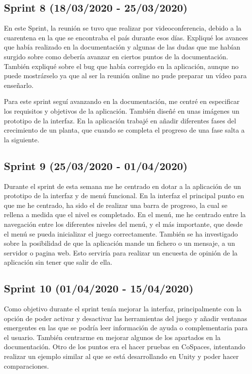 \subsection{Sprint 8 (18/03/2020 - 25/03/2020)}
En este Sprint, la reunión se tuvo que realizar por videoconferencia, debido a la cuarentena en la que se encontraba el país durante esos días. Expliqué los avances que había realizado en la documentación y algunas de las dudas que me habían surgido sobre como debería avanzar en ciertos puntos de la documentación. También expliqué sobre el bug que había corregido en la aplicación, aunque no puede mostrárselo ya que al ser la reunión online  no pude preparar un vídeo para enseñarlo.
 
Para este sprint seguí avanzando en la documentación, me centré en especificar los requisitos y objetivos de la aplicación. También diseñé en unas imágenes un prototipo de la interfaz. En la aplicación trabajé en añadir diferentes fases del crecimiento de un planta, que cuando se completa el progreso de una fase salta a la siguiente. 
\subsection{Sprint 9 (25/03/2020 - 01/04/2020)}
Durante el sprint de esta semana me he centrado en dotar a la aplicación de un prototipo de la interfaz y de menú funcional. En la interfaz el principal punto en que me he centrado, ha sido el de realizar una barra de progreso, la cual se rellena a medida que el nivel es completado. En el menú, me he centrado entre la navegación entre los diferentes niveles del menú, y el más importante, que desde el menú se pueda inicializar el juego correctamente.
También se ha investigado sobre la posibilidad de que la aplicación mande un fichero o un mensaje, a un servidor o pagina web. Esto serviría para realizar un encuesta de opinión de la aplicación sin tener que salir de ella. 
\subsection{Sprint 10 (01/04/2020 - 15/04/2020)}
Como objetivo durante el sprint tenía mejorar la interfaz, principalmente con la opción de poder activar y desactivar las herramientas del juego y añadir ventanas emergentes en las que se podría leer información de ayuda o complementaria para el usuario. También centrarme en mejorar algunos de los apartados en la documentación.
Otro de los puntos era el hacer pruebas en CoSpaces, intentando realizar un ejemplo similar al que se está desarrollando en Unity y poder hacer comparaciones.


